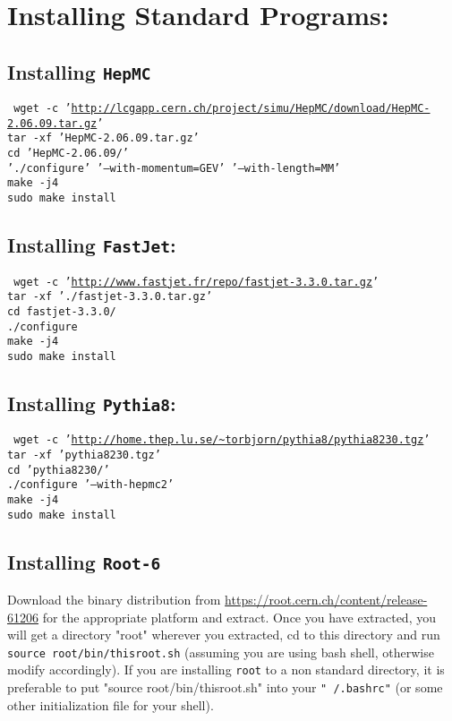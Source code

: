\section{Installing Standard Programs:}

\subsection{Installing {\tt HepMC}}
{\tt
wget -c '\url{http://lcgapp.cern.ch/project/simu/HepMC/download/HepMC-2.06.09.tar.gz}'\\
tar -xf 'HepMC-2.06.09.tar.gz'\\
cd 'HepMC-2.06.09/'\\
'./configure' '--with-momentum=GEV' '--with-length=MM'\\
make -j4\\
sudo make install\\
}

\subsection{Installing {\tt FastJet}:}
{\tt
wget -c '\url{http://www.fastjet.fr/repo/fastjet-3.3.0.tar.gz}'\\
tar -xf './fastjet-3.3.0.tar.gz'\\
cd fastjet-3.3.0/\\
./configure\\
make -j4\\
sudo make install
}

\subsection{Installing {\tt Pythia8}:}
{\tt
wget -c '\url{http://home.thep.lu.se/~torbjorn/pythia8/pythia8230.tgz}'\\
tar -xf 'pythia8230.tgz'\\
cd 'pythia8230/'\\
./configure '--with-hepmc2'\\
make -j4\\
sudo make install
}

\subsection{Installing {\tt Root-6}}
Download the binary distribution from \url{https://root.cern.ch/content/release-61206} for the appropriate platform and extract.
Once you have extracted, you will get a directory "root" wherever you extracted, cd to this directory and run
{\tt source root/bin/thisroot.sh} (assuming you are using bash shell, otherwise modify accordingly). If you are installing {\tt root} to a non standard directory, it is preferable to put "source root/bin/thisroot.sh" into your {\tt "~/.bashrc"} (or some other initialization file for your shell).

